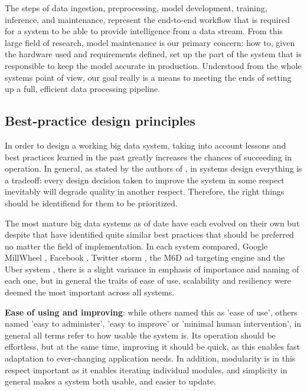 The steps of data ingestion, preprocessing, model development, training, inference, and maintenance, represent the end-to-end workflow that is required for a system to be able to provide intelligence from a data stream. From this large field of research, model maintenance is our primary concern: how to, given the hardware used and requirements defined, set up the part of the system that is responsible to keep the model accurate in production. Understood from the whole systems point of view, our goal really is a means to meeting the ends of setting up a full, efficient data processing pipeline.

\subsection{Best-practice design principles}

In order to design a working big data system, taking into account lessons and best practices learned in the past greatly increases the chances of succeeding in operation. In general, as stated by the authors of \cite{uber}, in systems design everything is a tradeoff: every design decision taken to improve the system in some respect inevitably will degrade quality in another respect. Therefore, the right things should be identifiend for them to be prioritized.

The most mature big data systems as of date have each evolved on their own but despite that have identified quite similar best practices that should be preferred no matter the field of implementation. In each system compared, Google MillWheel \cite{millwheel}, Facebook \cite{facebook}, Twitter storm \cite{storm@twitter}, the M6D ad targeting engine \cite{designprinciples} and the Uber system \cite{uber}, there is a slight variance in emphasis of importance and naming of each one, but in general the traits of ease of use, scalability and resiliency were deemed the most important across all systems.

\textbf{Ease of using and improving}: while others named this as 'ease of use', others named 'easy to administer', 'easy to improve' or 'minimal human intervention', in general all terms refer to how usable the system is. Its operation should be effortless, but at the same time, improving it should be quick, as this enables fast adaptation to ever-changing application needs. In addition, modularity is in this respect important as it enables iterating individual modules, and simplicity in general makes a system both usable, and easier to update.

